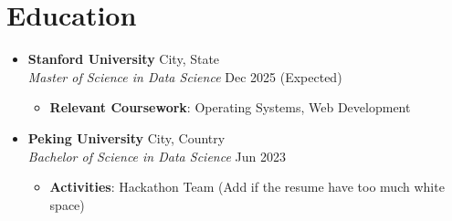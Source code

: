 \section{Education}

\begin{itemize}[leftmargin=0.15in]
    \item[] \textbf{Stanford University} \hfill {City, State} \\
    \textit{\small Master of Science in Data Science} \hfill {\small Dec 2025 (Expected)} \\
    \vspace{-3mm} 
    \begin{itemize}[leftmargin=0.3in, itemsep=0pt]
        \item {\small \textbf{Relevant Coursework}: Operating Systems, Web Development}
    \end{itemize}
    \vspace{-5mm} 

    \item[] \textbf{Peking University} \hfill {City, Country} \\
    \textit{\small Bachelor of Science in Data Science} \hfill {\small Jun 2023} \\
    \vspace{-3mm} 
    \begin{itemize}[leftmargin=0.3in, itemsep=0pt]
        \item {\small \textbf{Activities}: Hackathon Team (Add if the resume have too much white space)}
    \end{itemize}
\end{itemize}
